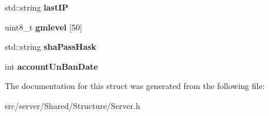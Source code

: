 \begin{DoxyCompactItemize}
\item 
\hypertarget{structs_client_a1b692a4b1fb1d0c736235de5f4a4b69b}{std\-::string {\bfseries last\-I\-P}}\label{structs_client_a1b692a4b1fb1d0c736235de5f4a4b69b}

\item 
\hypertarget{structs_client_acf686e336ac88fef0d9b9de63715ad01}{uint8\-\_\-t {\bfseries gmlevel} \mbox{[}50\mbox{]}}\label{structs_client_acf686e336ac88fef0d9b9de63715ad01}

\item 
\hypertarget{structs_client_a533385282f16d8a692b055bfa1cfeba6}{std\-::string {\bfseries sha\-Pass\-Hask}}\label{structs_client_a533385282f16d8a692b055bfa1cfeba6}

\item 
\hypertarget{structs_client_abf4b901829f60b987c9bdb114f8c1776}{int {\bfseries account\-Un\-Ban\-Date}}\label{structs_client_abf4b901829f60b987c9bdb114f8c1776}

\end{DoxyCompactItemize}


The documentation for this struct was generated from the following file\-:\begin{DoxyCompactItemize}
\item 
src/server/\-Shared/\-Structure/Server.\-h\end{DoxyCompactItemize}
